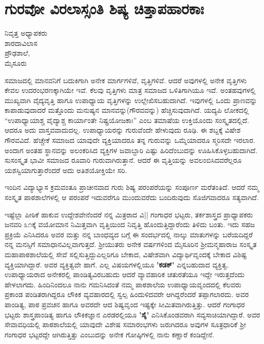 \chapter{ಗುರವೋ ವಿರಲಾಸ್ಸಂತಿ  ಶಿಷ್ಯ ಚಿತ್ತಾಪಹಾರಕಾಃ}

\begin{center}
\smallskip

ನಿವೃತ್ತ ಅಧ್ಯಾಪಕರು\\
ಶಾರದಾವಿಲಾಸ\\ 
ಪ್ರೌಢಶಾಲೆ,\\ 
ಮೈಸೂರು
\end{center}

ಸಮಾಜದಲ್ಲಿ ಮಾನವನಿಗೆ ಬದುಕಿಗಾಗಿ ಅನೇಕ ಮಾರ್ಗಗಳಿವೆ, ವೃತ್ತಿಗಳಿವೆ. ಆದರೆ ಅವುಗಳಲ್ಲಿ ಅನೇಕ ವೃತ್ತಿಗಳು ಕೇವಲ ಉದರಂಭರಣಕ್ಕಾಗಿಯೇ ಇವೆ. ಕೆಲವು ವೃತ್ತಿಗಳು ಮಾತ್ರ ಸಮಾಜದ ಒಳಿತಿಗಾಗಿಯೂ ಇವೆ. ಅಂತಹವುಗಳಲ್ಲಿ ಮುಖ್ಯವಾಗಿ ವೈದ್ಯವೃತ್ತಿ ಹಾಗೂ ಉಪಾಧ್ಯಾಯ ವೃತ್ತಿಗಳನ್ನು ಉಲ್ಲೇಖಿಸಬಹುದಾಗಿದೆ. ಇವುಗಳಲ್ಲಿ ಒಂದು ಪ್ರಾಣವನ್ನು ಕಾಪಾಡುವುದಾದರೆ ಮತ್ತೊಂದು ಮನುಷ್ಯನ ಮಾನವನ್ನು(ಗೌರವವನ್ನು) ಹೆಚ್ಚಿಸುವುದಾಗಿದೆ. ಯದ್ಯಪಿ ಲೋಕದಲ್ಲಿ “ಉಪಾಧ್ಯಾಯಾಶ್ಚ ವೈದ್ಯಾಶ್ಚ ಕಾರ್ಯಾಂತೇ ನಿಷ್ಪ್ರಯೋಜಕಾಃ” ಎಂಬ ತಮಾಷೆಯ ಉಕ್ತಿಯೊಂದು ಸಂಸ್ಕೃತದಲ್ಲಿದೆ. ಆದರೂ ಅದು ವಾಸ್ತವವಾದುದಲ್ಲ. ಉಪಾಧ್ಯಾಯರನ್ನು ಗುರುವೆಂದೇ ಹೇಳುವುದು ರೂಢಿ. ಈ ಶಬ್ದಕ್ಕೆ ವಿಷೇಶ ಗೌರವವಿದೆ. ಹೆಚ್ಚೇಕೆ ಸಮಾಜದ ಯಾವುದೇ ವ್ಯಕ್ತಿಯಾದರೂ ತನ್ನ ಗುರುವನ್ನು ಒಮ್ಮೆಯಾದರೂ ಸ್ಮರಿಸದೇ ಇರಲಾರ. ಅಂದಾಗ ಅಂತಹ ಸ್ಥಾನವನ್ನು ಅಲಂಕರಿಸಿದ ವ್ಯಕ್ತಿಗಳ ಜವಾಬ್ದಾರಿ ಎಷ್ಟು ಹಿರಿದೆಂಬುದನ್ನು ಊಹಿಸಿಕೊಳ್ಳಬಹುದಾಗಿದೆ. ಸುಸಂಸ್ಕೃತ ಭಾವೀ ಸಮಾಜದ ರೂವಾರಿ ಗುರುವಾಗಿರುತ್ತಾನೆ. ಆದರೆ ಈ ವೃತ್ತಿಯನ್ನು ಅವಲಂಬಿಸಿದವರೆಲ್ಲರೂ ಯಶಸ್ವಿಯಾಗುತ್ತಾರೆಂದರೆ ಅದು ಅತಿಶಯೋಕ್ತಿಯೇ ಸರಿ.

ಇಂದಿನ ವಿದ್ಯಾಭ್ಯಾಸ ಕ್ರಮವಂತೂ ಪ್ರಾಚೀನವಾದ ಗುರು ಶಿಷ್ಯ ಪರಂಪರೆಯನ್ನು ಸಂಪೂರ್ಣ ಮರೆತಂತಿದೆ. ಆದರೆ ನಮ್ಮ ಸಂಸ್ಕೃತ ಪಾಠಶಾಲೆಗಳಲ್ಲಿ ಆ ಪರಂಪರೆ ಇದುವರೆಗೂ ಮುಂದುವರೆದು ಬಂದಿರುವುದು ಸೊಜಿಗವಾದರೂ ಸತ್ಯವಾಗಿದೆ.

ಇಷ್ಟೆಲ್ಲಾ ಪೀಠಿಕೆ ಹಾಕುವ ಉದ್ದೇಶವೇನೆಂದರೆ ನನ್ನ ಮಿತ್ರರಾದ ವಿ|| ಗಂಗಾಧರ ಭಟ್ಟರು, ತರ್ಕಶಾಸ್ತ್ರದ ಪ್ರಾಧ್ಯಾಪಕರು ಜನವರಿ ೩೧ಕ್ಕೆ ವಯೋಮಾನ ನಿಮಿತ್ತವಾಗಿ ವೃತ್ತಿಯಿಂದ ನಿವೃತ್ತಿ ಹೊಂದುತ್ತಿದ್ದಾರೆಂದು ತಿಳಿದು ಬಂತು. ಇದು ಸಹಜ ಪ್ರಕ್ರಿಯೆ ಎನಿಸಿದರೂ ಅವರ ಮತ್ತು ನನ್ನ ಬಾಂಧವ್ಯದ ಬಗ್ಗೆ ಈ ಸಂದರ್ಭದಲ್ಲಿ ನಾಲ್ಕು ಮಾತುಗಳನ್ನು ಬರೆಯದಿದ್ದರೆ ನನ್ನ ಮನಸ್ಸಿಗೆ ಸಮಾಧಾನವಿಲ್ಲವಾಗುತ್ತದೆ. ಶ್ರೀಯುತರು ಅನೇಕ ವರ್ಷಗಳಿಂದ ಮೈಸೂರಿನ ಶ್ರೀಮನ್ಮಹಾರಾಜ ಸಂಸ್ಕೃತ ಮಹಾಪಾಠಶಾಲೆಯಲ್ಲಿ ಸೇವೆ ಸಲ್ಲಿಸುತ್ತಿದ್ದುಎಲ್ಲರಿಗೂ ಬೇಕಾದ, ವಿಷೇಶವಾಗಿ ವಿದ್ಯಾರ್ಥಿವೃಂದಕ್ಕೆ ಬೇಕಾದ ವಿಶಿಷ್ಟ ವ್ಯಕ್ತಿಯಾಗಿದ್ದಾರೆ. ಅವರ ವ್ಯಕ್ತಿತ್ವವೇ ಹಾಗೆ. ಎಲ್ಲ ವಿಷಯಗಳಲ್ಲಿಯೂ \textbf{’ಕಡಕ್’} ಎನ್ನಬಹುದಾದ ವ್ಯಕ್ತಿತ್ವ. ಉಪಾಧ್ಯಾಯರಾದ ಅನೇಕರಲ್ಲಿ ಪಾಂಡಿತ್ಯವಿರಬಹುದು ಆದರೆ ವ್ಯಾವಹಾರಿಕ ಚತುರತೆಯೂ ಇದ್ದೇ ಇರುತ್ತದೆಂದು ಹೇಳಲಾಗದು. ಹಿಂದಿನಿಂದಲೂ ನಾನು ಗಮನಿಸಿದಂತೆ ನಮ್ಮ ಪಾಠಶಾಲೆಯ ಉಪಾಧ್ಯಾಯವೃಂದದಲ್ಲಿ ಕೆಲವರು ಪ್ರಕಾಂಡ ಪಂಡಿತರಾಗಿದ್ದರೂ ಲೌಕಿಕ ವ್ಯವಹಾರದಲ್ಲಿ ಸ್ವಲ್ಪ ಹಿಂದುಳಿದವರೇ ಆಗಿದ್ದರೆಂದರೆ ತಪ್ಪಾಗಲಾರದು. ಅವರ ಪಾಂಡಿತ್ಯ, ಪಾಠ ಪ್ರವಚನ ಹಾಗೂ ಅವರದೇ ಆದ ಶಿಷ್ಯವೃಂದ ಇಷ್ಟಕ್ಕೇ ಸೀಮಿತವಾಗಿರುತ್ತಿತ್ತು. ಆದರೆ ಗಂಗಾಧರ ಭಟ್ಟರು ಶಾಸ್ತ್ರಪಾಂಡಿತ್ಯ ಹಾಗೂ ಲೌಕಿಕಜ್ಞಾನ ಎರಡರಲ್ಲಿಯೂ \textbf{’ಸೈ’} ಎನಿಸಿಕೊಂಡವರಾಗಿ ಸವ್ಯಸಾಚಿಯಾಗಿದ್ದಾರೆ. ಅವರ ಸೇವಾವಧಿಯಲ್ಲಿ ಪಾಠಶಾಲೆಯಲ್ಲಿ ಯಾವುದೇ ವಿಶೇಷ ಸಮಾರಂಭಗಳು ಜರುಗಿದರೂ ಅವುಗಳ ಸೂತ್ರಧಾರಿಕೆ ಶ್ರೀ ಗಂಗಾಧರ ಭಟ್ಟರದ್ದೇ ಆಗಿರುತ್ತಿತ್ತು ಎಂಬುದನ್ನು ಅನೇಕ ಗೋಷ್ಠಿಗಳಲ್ಲಿ ನಾನು ಕಣ್ಣಾರೆ ಕಂಡಿದ್ದೇನೆ.

